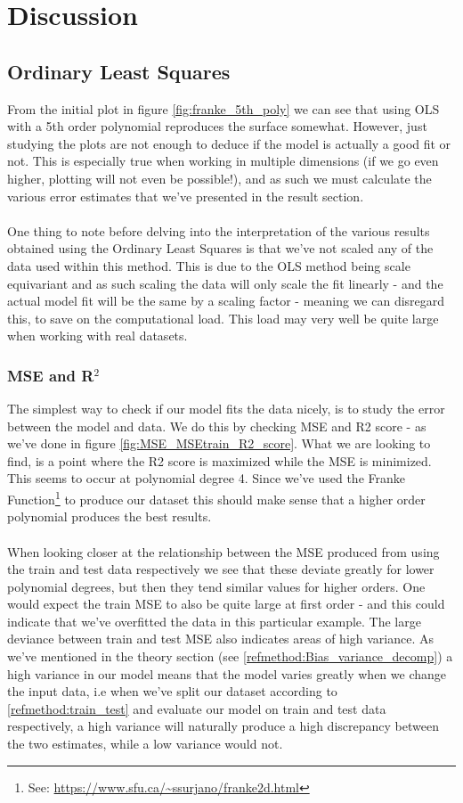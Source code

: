 \documentclass[../main.tex]{subfiles}
\begin{document}
\newpage
\section{Discussion}
\subsection{Ordinary Least Squares}
From the initial plot in figure \eqref{fig:franke_5th_poly} we can see that using OLS with a 5th order polynomial reproduces the surface somewhat. However, just studying the plots are not enough to deduce if the model is actually a good fit or not. This is especially true when working in multiple dimensions (if we go even higher, plotting will not even be possible!), and as such we must calculate the various error estimates that we've presented in the result section. \\ \\ \indent One thing to note before delving into the interpretation of the various results obtained using the Ordinary Least Squares is that we've not scaled any of the data used within this method. \cite{Linear_regression}This is due to the OLS method being scale equivariant and as such scaling the data will only scale the fit linearly - and the actual model fit will be the same by a scaling factor - meaning we can disregard this, to save on the computational load. This load may very well be quite large when working with real datasets.
\subsubsection{MSE and R$^2$}
The simplest way to check if our model fits the data nicely, is to study the error between the model and data. We do this by checking MSE and R2 score - as we've done in figure \eqref{fig:MSE_MSEtrain_R2_score}. What we are looking to find, is a point where the R2 score is maximized while the MSE is minimized. This seems to occur at polynomial degree 4. Since we've used the Franke Function\footnote{See: \url{https://www.sfu.ca/~ssurjano/franke2d.html}} to produce our dataset this should make sense that a higher order polynomial produces the best results.
\\ \\ \indent When looking closer at the relationship between the MSE produced from using the train and test data respectively we see that these deviate greatly for lower polynomial degrees, but then they tend similar values for higher orders. One would expect the train MSE to also be quite large at first order - and this could indicate that we've overfitted the data in this particular example. The large deviance between train and test MSE also indicates areas of high variance. As we've mentioned in the theory section (see \eqref{refmethod:Bias_variance_decomp}) a high variance in our model means that the model varies greatly when we change the input data, i.e when we've split our dataset according to \eqref{refmethod:train_test} and evaluate our model on train and test data respectively, a high variance will naturally produce a high discrepancy between the two estimates, while a low variance would not.
\end{document}
